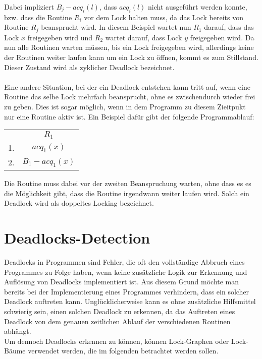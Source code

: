 Dabei impliziert $B_j-acq_i(l)$, dass $acq_{i}(l)$ nicht ausgeführt werden konnte,
bzw. dass die Routine $R_i$ vor dem Lock halten muss, da das Lock bereits von 
Routine $R_j$ beansprucht wird. In diesem Beispiel wartet nun $R_1$ 
darauf, dass das Lock $x$ freigegeben wird und $R_2$ wartet darauf, dass Lock 
$y$ freigegeben wird. Da nun alle Routinen warten müssen, bis ein Lock freigegeben 
wird, allerdings keine der Routinen weiter laufen kann um ein Lock zu öffnen, 
kommt es zum Stillstand. Dieser Zustand wird als zyklicher Deadlock bezeichnet.\\\\
Eine andere Situation, bei der ein Deadlock entstehen kann tritt auf, wenn 
eine Routine das selbe Lock mehrfach beansprucht, ohne es zwischendurch wieder 
frei zu geben. Dies ist sogar möglich, wenn in dem Programm zu diesem Zieitpukt
nur eine Routine aktiv ist. Ein Beispiel dafür gibt der folgende Programmablauf:
\begin{table}[H]
    \centering
    \begin{tabular}{cc}
        & $R_1$ \\
        1. & $acq_{1}(x)$ \\
        2. & $B_1-acq_1(x)$
    \end{tabular}
\end{table}
Die Routine muss dabei vor der zweiten Beanspruchung warten,
ohne dass es es die Möglichkeit gibt, dass die Routine irgendwann weiter laufen wird.
Solch ein Deadlock wird als doppeltes Locking bezeichnet.\\
\section{Deadlocks-Detection}
Deadlocks in Programmen sind Fehler, die oft den vollständige Abbruch eines 
Programmes zu Folge haben, wenn keine zusätzliche Logik zur Erkennung und Auflösung von 
Deadlocks implementiert ist. Aus diesem Grund möchte man bereits bei der 
Implementierung eines Programmes verhindern, dass ein solcher Deadlock auftreten 
kann. Unglücklicherweise kann es ohne zusätzliche Hilfsmittel schwierig sein, 
einen solchen Deadlock zu erkennen, da das Auftreten eines Deadlock von dem 
genauen zeitlichen Ablauf der verschiedenen Routinen abhängt.\\
Um dennoch Deadlocks 
erkennen zu können, können Lock-Graphen oder Lock-Bäume verwendet werden, die 
im folgenden betrachtet werden sollen.

